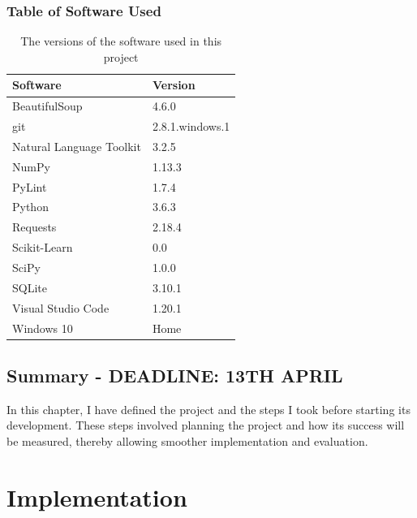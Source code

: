 \documentclass[12pt,a4paper,twoside,openright]{report}
\begin{document}
\subsection{Table of Software Used}
\begin{table}[H]
	\centering
	\label{table:software}
	\begin{tabular}{ll}
		\textbf{Software}        & \textbf{Version} \\ \hline
		BeautifulSoup            & 4.6.0            \\
		git                      & 2.8.1.windows.1  \\
		Natural Language Toolkit & 3.2.5            \\
		NumPy                    & 1.13.3           \\
		PyLint                   & 1.7.4            \\
		Python                   & 3.6.3            \\
		Requests                 & 2.18.4           \\
		Scikit-Learn             & 0.0              \\
		SciPy                    & 1.0.0            \\
		SQLite                   & 3.10.1           \\
		Visual Studio Code       & 1.20.1           \\
		Windows 10               & Home             \\
	\end{tabular}
	\caption{The versions of the software used in this project}
\end{table}

\section{Summary - DEADLINE: 13TH APRIL}

In this chapter, I have defined the project and the steps I took before starting its development. These steps involved planning the project and how its success will be measured, thereby allowing smoother implementation and evaluation.

\chapter{Implementation} \label{impl}
\end{document}
